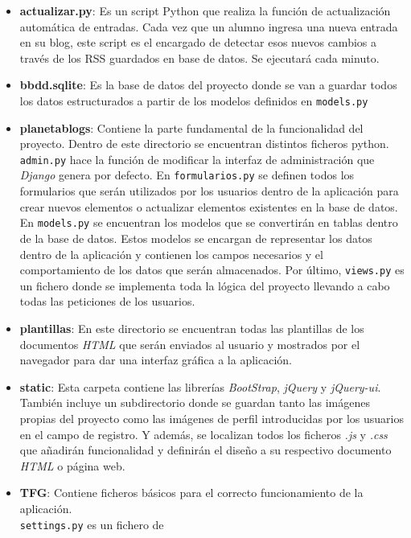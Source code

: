 \documentclass[a4paper, 12pt]{book}
\begin{document}
\begin{itemize}
  \item {\bfseries actualizar.py}: Es un script Python que realiza la funci\'on de actualizaci\'on autom\'atica de entradas. Cada vez que un alumno ingresa
  una nueva entrada en su blog, este script es el encargado de detectar esos nuevos cambios a trav\'es de los RSS guardados en base de datos. Se ejecutar\'a
  cada minuto.
  \item {\bfseries bbdd.sqlite}: Es la base de datos del proyecto donde se van a guardar todos los datos estructurados a partir de los modelos definidos en 
  \texttt{models.py}
  \item {\bfseries planetablogs}: Contiene la parte fundamental de la funcionalidad del proyecto. Dentro de este directorio se encuentran distintos ficheros
  python. \texttt{admin.py} hace la funci\'on de modificar la interfaz de administraci\'on que \textit{Django} genera por defecto. En \texttt{formularios.py}
  se definen todos los formularios que ser\'an utilizados por los usuarios dentro de la aplicaci\'on para crear nuevos elementos o actualizar elementos
  existentes en la base de datos. En \texttt{models.py} se encuentran los modelos que se convertir\'an en tablas dentro de la base de datos. Estos modelos se
  encargan de representar los datos dentro de la aplicaci\'on y contienen los campos necesarios y el comportamiento de los datos que ser\'an almacenados.
  Por \'ultimo, \texttt{views.py} es un fichero donde se implementa toda la l\'ogica del proyecto llevando a cabo todas las peticiones de los usuarios.
  \item {\bfseries plantillas}: En este directorio se encuentran todas las plantillas de los documentos \textit{HTML} que ser\'an enviados al usuario y 
  mostrados por el navegador para dar una interfaz gr\'afica a la aplicaci\'on.
  \item {\bfseries static}: Esta carpeta contiene las librer\'ias \textit{BootStrap}, \textit{jQuery} y \textit{jQuery-ui}. Tambi\'en incluye un subdirectorio
  donde se guardan tanto las im\'agenes propias del proyecto como las im\'agenes de perfil introducidas por los usuarios en el campo de registro. 
  Y adem\'as, se localizan todos los ficheros \textit{.js} y \textit{.css} que a\~nadir\'an funcionalidad y definir\'an el dise\~no a su respectivo 
  documento \textit{HTML} o p\'agina web.
  \item {\bfseries TFG}: Contiene ficheros b\'asicos para el correcto funcionamiento de la aplicaci\'on.\\ \texttt{settings.py} es un fichero de 

\end{itemize}
\end{document}
